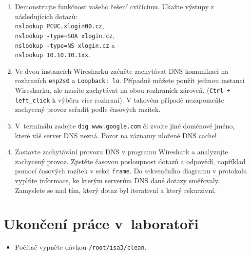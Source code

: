 \begin{enumerate}
  \item Demonstrujte funkčnost vašeho řešení cvičícímu. Ukažte výstupy z následujících dotazů: \\
    {\tt nslookup PCUC.xlogin00.cz}, \\
    {\tt nslookup -type=SOA xlogin.cz}, \\
    {\tt nslookup -type=NS xlogin.cz} a \\
    {\tt nslookup 10.10.10.1xx}. 
  \item Ve dvou instancích Wiresharku začněte zachytávat DNS komunikaci na rozhraních {\tt enp2s0} a {\tt Loopback: lo}. Případně můžete použít jedinou instanci Wiresharku, ale musíte zachytávat na obou rozhraních zároveň. (\texttt{Ctrl + left\_click} k výběru více rozhraní). V takovém případě nezapomeňte zachycený provoz seřadit podle časových razítek.
  
  \item V~terminálu zadejte {\tt dig www.google.com} či zvolte jiné doménové jméno, které váš server DNS nezná. Pozor na záznamy uložené DNS cache!
  
  \item Zastavte zachytávání provozu DNS v programu Wireshark a analyzujte zachycený provoz. Zjistěte časovou posloupnost dotazů a odpovědí, například pomocí časových razítek v sekci \texttt{frame}. Do sekvenčního diagramu v  protokolu vyplňte informace, ke kterým serverům DNS dané dotazy směřovaly. Zamyslete se nad tím, který dotaz byl iterativní a který rekurzivní. 
\end{enumerate}

\section{Ukončení práce v~laboratoři}
\begin{itemize}
  \item Počítač vypněte dávkou {\tt /root/isa3/clean}.
\end{itemize}
